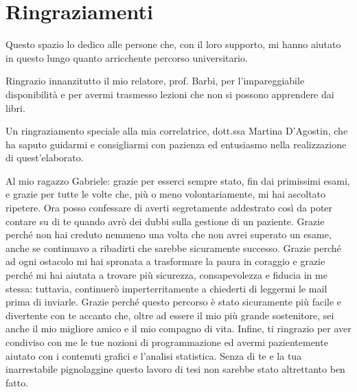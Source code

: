 \setcounter{secnumdepth}{-1}
\chapter{Ringraziamenti}

Questo spazio lo dedico alle persone che, con il loro supporto, mi hanno aiutato in questo lungo quanto arricchente percorso universitario. 

\bigskip \noindent
Ringrazio innanzitutto il mio relatore, prof. Barbi, per l'impareggiabile disponibilità e per avermi trasmesso lezioni che non si possono apprendere dai libri.

\bigskip \noindent
Un ringraziamento speciale alla mia correlatrice, dott.ssa Martina D'Agostin, che ha saputo guidarmi e consigliarmi con pazienza ed entusiasmo nella realizzazione di quest'elaborato. %

\bigskip \noindent
Al mio ragazzo Gabriele: grazie per esserci sempre stato, fin dai primissimi esami, e grazie per tutte le volte che, più o meno volontariamente, mi hai ascoltato ripetere. Ora posso confessare di averti segretamente addestrato così da poter contare su di te quando avrò dei dubbi sulla gestione di un paziente.
Grazie perché non hai creduto nemmeno una volta che non avrei superato un esame, anche se continuavo a ribadirti che sarebbe sicuramente successo. 
Grazie perché ad ogni ostacolo mi hai spronata a trasformare la paura in coraggio e grazie perché mi hai aiutata a trovare più sicurezza, consapevolezza e fiducia in me stessa: tuttavia, continuerò imperterritamente a chiederti di leggermi le mail prima di inviarle. 
Grazie perché questo percorso è stato sicuramente più facile e divertente con te accanto che, oltre ad essere il mio più grande sostenitore, sei anche il mio migliore amico e il mio compagno di vita. 
Infine, ti ringrazio per aver condiviso con me le tue nozioni di programmazione ed avermi pazientemente aiutato con i contenuti grafici e l'analisi statistica. Senza di te e la tua inarrestabile pignolaggine questo lavoro di tesi non sarebbe stato altrettanto ben fatto.


